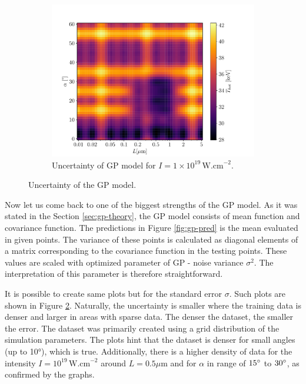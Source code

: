 \begin{figure}[ht]
\begin{subfigure}{0.49\textwidth}
		\centering
		\includegraphics[width=\textwidth]{figures/gp19_pred_ss}
		\caption{Uncertainty of GP model for $I = 1 \times 10^{19} \, \mathrm{W.cm}^{-2}$.}
		\label{fig:gp-pred-ss-c}
	\end{subfigure}
	\caption{Uncertainty of the GP model.}
	\label{fig:gp-pred-ss}
\end{figure}

Now let us come back to one of the biggest strengths of the GP model. As it was stated in the Section \ref{sec:gp-theory}, the GP model consists of mean function and covariance function. The predictions in Figure \ref{fig:gp-pred} is the mean evaluated in given points. The variance of these points is calculated as diagonal elements of a matrix corresponding to the covariance function in the testing points. These values are scaled with optimized parameter of GP - noise variance $\sigma^2$. The interpretation of this parameter is therefore straightforward.

It is possible to create same plots but for the standard error $\sigma$. Such plots are shown in Figure \ref{fig:gp-pred-ss}. Naturally, the uncertainty is smaller where the training data is denser and larger in areas with sparse data. The denser the dataset, the smaller the error. The dataset was primarily created using a grid distribution of the simulation parameters. The plots hint that the dataset is denser for small angles (up to 10°), which is true. Additionally, there is a higher density of data for the intensity $I = 10^{19} \, \mathrm{W.cm}^{-2}$ around $L = 0.5\mu \mathrm{m}$ and for $\alpha$ in range of $15\degree$ to $ 30\degree$, as confirmed by the graphs.

